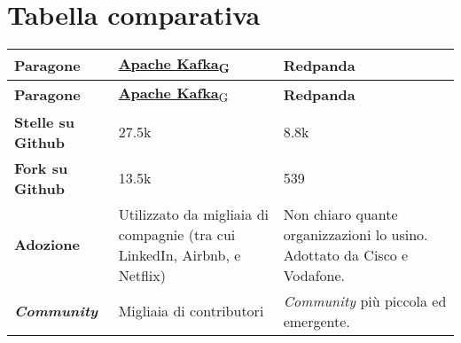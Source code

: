 \section{Tabella comparativa}
\begin{longtable}{|p{4cm}||p{5.5cm}|p{5.5cm}|}
	\hline
	\textbf{Paragone}                    & \href{https://7last.github.io/docs/rtb/documentazione-interna/glossario#apache-kafka}{\textbf{Apache Kafka}\textsubscript{G}}                                                         & \textbf{Redpanda}                                                                                                                                                                \\
	\hline
	\endfirsthead
	\hline
	\textbf{Paragone}                    & \href{https://7last.github.io/docs/rtb/documentazione-interna/glossario#apache-kafka}{\textbf{Apache Kafka}\textsubscript{G}}                                                         & \textbf{Redpanda}                                                                                                                                                                \\
	\hline
	\textbf{Stelle su Github}            & 27.5k                                                                         & 8.8k                                                                                                                                                                             \\
	\hline
	\textbf{Fork su Github}              & 13.5k                                                                         & 539                                                                                                                                                                              \\
	\hline
	\textbf{Adozione}                    & Utilizzato da migliaia di compagnie (tra cui LinkedIn, Airbnb, e Netflix)     & Non chiaro quante organizzazioni lo usino. Adottato da Cisco e Vodafone.                                                                                                         \\
	\hline
	\textbf{\textit{Community}}          & Migliaia di contributori                                                      & \textit{Community} più piccola                                        ed emergente.                                                                                              \\
	\hline

\end{longtable}
